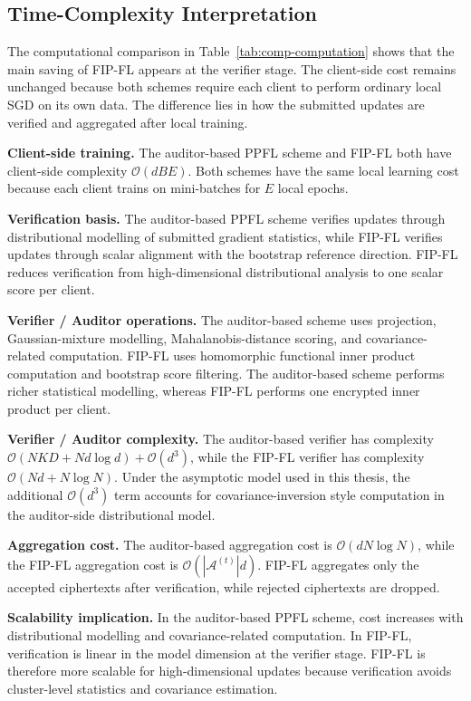 \subsection{Time-Complexity Interpretation}
\label{sec:comp-time-interpretation}

The computational comparison in Table~\ref{tab:comp-computation} shows that the main saving of FIP-FL appears at the verifier stage. The client-side cost remains unchanged because both schemes require each client to perform ordinary local SGD on its own data. The difference lies in how the submitted updates are verified and aggregated after local training.

\noindent\textbf{Client-side training.}
The auditor-based PPFL scheme and FIP-FL both have client-side complexity $\mathcal{O}(dBE)$. Both schemes have the same local learning cost because each client trains on mini-batches for $E$ local epochs.

\noindent\textbf{Verification basis.}
The auditor-based PPFL scheme verifies updates through distributional modelling of submitted gradient statistics, while FIP-FL verifies updates through scalar alignment with the bootstrap reference direction. FIP-FL reduces verification from high-dimensional distributional analysis to one scalar score per client.

\noindent\textbf{Verifier / Auditor operations.}
The auditor-based scheme uses projection, Gaussian-mixture modelling, Mahalanobis-distance scoring, and covariance-related computation. FIP-FL uses homomorphic functional inner product computation and bootstrap score filtering. The auditor-based scheme performs richer statistical modelling, whereas FIP-FL performs one encrypted inner product per client.

\noindent\textbf{Verifier / Auditor complexity.}
The auditor-based verifier has complexity $\mathcal{O}(NKD+Nd\log d)+\mathcal{O}(d^3)$, while the FIP-FL verifier has complexity $\mathcal{O}(Nd+N\log N)$. Under the asymptotic model used in this thesis, the additional $\mathcal{O}(d^3)$ term accounts for covariance-inversion style computation in the auditor-side distributional model.

\noindent\textbf{Aggregation cost.}
The auditor-based aggregation cost is $\mathcal{O}(dN\log N)$, while the FIP-FL aggregation cost is $\mathcal{O}(|\mathcal{A}^{(t)}|d)$. FIP-FL aggregates only the accepted ciphertexts after verification, while rejected ciphertexts are dropped.

\noindent\textbf{Scalability implication.}
In the auditor-based PPFL scheme, cost increases with distributional modelling and covariance-related computation. In FIP-FL, verification is linear in the model dimension at the verifier stage. FIP-FL is therefore more scalable for high-dimensional updates because verification avoids cluster-level statistics and covariance estimation.

